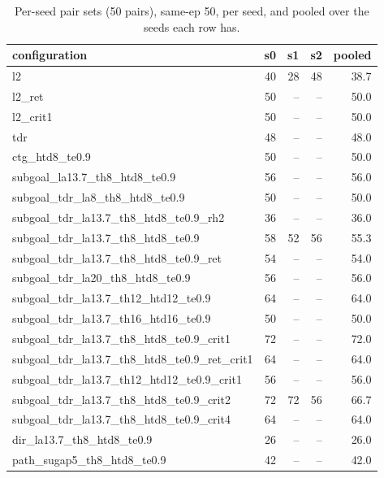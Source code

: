 \begin{table}[H]
\centering\small
\caption{Per-seed pair sets (50 pairs), same-ep 50, per seed, and pooled over the seeds each row has.}
\label{tab:gas-mpc-pooled-same50-perseed-n50}
\begin{tabular}{lrrrr}
\toprule
configuration & s0 & s1 & s2 & pooled \\
\midrule
l2 & 40 & 28 & 48 & 38.7 \\
l2\_ret & 50 & -- & -- & 50.0 \\
l2\_crit1 & 50 & -- & -- & 50.0 \\
tdr & 48 & -- & -- & 48.0 \\
ctg\_htd8\_te0.9 & 50 & -- & -- & 50.0 \\
subgoal\_la13.7\_th8\_htd8\_te0.9 & 56 & -- & -- & 56.0 \\
subgoal\_tdr\_la8\_th8\_htd8\_te0.9 & 50 & -- & -- & 50.0 \\
subgoal\_tdr\_la13.7\_th8\_htd8\_te0.9\_rh2 & 36 & -- & -- & 36.0 \\
subgoal\_tdr\_la13.7\_th8\_htd8\_te0.9 & 58 & 52 & 56 & 55.3 \\
subgoal\_tdr\_la13.7\_th8\_htd8\_te0.9\_ret & 54 & -- & -- & 54.0 \\
subgoal\_tdr\_la20\_th8\_htd8\_te0.9 & 56 & -- & -- & 56.0 \\
subgoal\_tdr\_la13.7\_th12\_htd12\_te0.9 & 64 & -- & -- & 64.0 \\
subgoal\_tdr\_la13.7\_th16\_htd16\_te0.9 & 50 & -- & -- & 50.0 \\
subgoal\_tdr\_la13.7\_th8\_htd8\_te0.9\_crit1 & 72 & -- & -- & 72.0 \\
subgoal\_tdr\_la13.7\_th8\_htd8\_te0.9\_ret\_crit1 & 64 & -- & -- & 64.0 \\
subgoal\_tdr\_la13.7\_th12\_htd12\_te0.9\_crit1 & 56 & -- & -- & 56.0 \\
subgoal\_tdr\_la13.7\_th8\_htd8\_te0.9\_crit2 & 72 & 72 & 56 & 66.7 \\
subgoal\_tdr\_la13.7\_th8\_htd8\_te0.9\_crit4 & 64 & -- & -- & 64.0 \\
dir\_la13.7\_th8\_htd8\_te0.9 & 26 & -- & -- & 26.0 \\
path\_sugap5\_th8\_htd8\_te0.9 & 42 & -- & -- & 42.0 \\
\bottomrule
\end{tabular}
\end{table}

